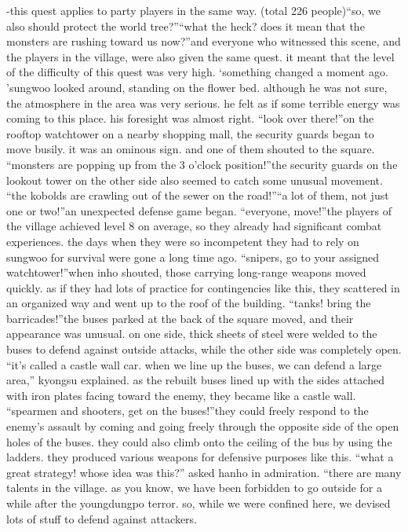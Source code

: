 -this quest applies to party players in the same way.
 (total 226 people)“so, we also should protect the world tree?”“what the heck? does it mean that the monsters are rushing toward us now?”and everyone who witnessed this scene, and the players in the village, were also given the same quest.
 it meant that the level of the difficulty of this quest was very high.
‘something changed a moment ago.
’sungwoo looked around, standing on the flower bed.
 although he was not sure, the atmosphere in the area was very serious.
he felt as if some terrible energy was coming to this place.
 his foresight was almost right.
“look over there!”on the rooftop watchtower on a nearby shopping mall, the security guards began to move busily.
 it was an ominous sign.
 and one of them shouted to the square.
“monsters are popping up from the 3 o’clock position!”the security guards on the lookout tower on the other side also seemed to catch some unusual movement.
“the kobolds are crawling out of the sewer on the road!”“a lot of them, not just one or two!”an unexpected defense game began.
“everyone, move!”the players of the village achieved level 8 on average, so they already had significant combat experiences.
 the days when they were so incompetent they had to rely on sungwoo for survival were gone a long time ago.
“snipers, go to your assigned watchtower!”when inho shouted, those carrying long-range weapons moved quickly.
as if they had lots of practice for contingencies like this, they scattered in an organized way and went up to the roof of the building.
“tanks! bring the barricades!”the buses parked at the back of the square moved, and their appearance was unusual.
on one side, thick sheets of steel were welded to the buses to defend against outside attacks, while the other side was completely open.
“it’s called a castle wall car.
 when we line up the buses, we can defend a large area,” kyongsu explained.
as the rebuilt buses lined up with the sides attached with iron plates facing toward the enemy, they became like a castle wall.
“spearmen and shooters, get on the buses!”they could freely respond to the enemy’s assault by coming and going freely through the opposite side of the open holes of the buses.
 they could also climb onto the ceiling of the bus by using the ladders.
 they produced various weapons for defensive purposes like this.
“what a great strategy! whose idea was this?” asked hanho in admiration.
“there are many talents in the village.
 as you know, we have been forbidden to go outside for a while after the youngdungpo terror.
 so, while we were confined here, we devised lots of stuff to defend against attackers.
